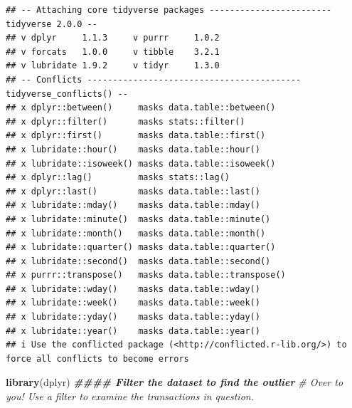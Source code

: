 \documentclass[
]{article}
\newenvironment{Shaded}{\begin{snugshade}}{\end{snugshade}}
\newcommand{\CommentTok}[1]{\textcolor[rgb]{0.56,0.35,0.01}{\textit{#1}}}
\newcommand{\DecValTok}[1]{\textcolor[rgb]{0.00,0.00,0.81}{#1}}
\newcommand{\DocumentationTok}[1]{\textcolor[rgb]{0.56,0.35,0.01}{\textbf{\textit{#1}}}}
\newcommand{\FunctionTok}[1]{\textcolor[rgb]{0.13,0.29,0.53}{\textbf{#1}}}
\newcommand{\NormalTok}[1]{#1}
\newcommand{\OtherTok}[1]{\textcolor[rgb]{0.56,0.35,0.01}{#1}}
\newcommand{\SpecialCharTok}[1]{\textcolor[rgb]{0.81,0.36,0.00}{\textbf{#1}}}
\begin{document}
\begin{verbatim}
## -- Attaching core tidyverse packages ------------------------ tidyverse 2.0.0 --
## v dplyr     1.1.3     v purrr     1.0.2
## v forcats   1.0.0     v tibble    3.2.1
## v lubridate 1.9.2     v tidyr     1.3.0
## -- Conflicts ------------------------------------------ tidyverse_conflicts() --
## x dplyr::between()     masks data.table::between()
## x dplyr::filter()      masks stats::filter()
## x dplyr::first()       masks data.table::first()
## x lubridate::hour()    masks data.table::hour()
## x lubridate::isoweek() masks data.table::isoweek()
## x dplyr::lag()         masks stats::lag()
## x dplyr::last()        masks data.table::last()
## x lubridate::mday()    masks data.table::mday()
## x lubridate::minute()  masks data.table::minute()
## x lubridate::month()   masks data.table::month()
## x lubridate::quarter() masks data.table::quarter()
## x lubridate::second()  masks data.table::second()
## x purrr::transpose()   masks data.table::transpose()
## x lubridate::wday()    masks data.table::wday()
## x lubridate::week()    masks data.table::week()
## x lubridate::yday()    masks data.table::yday()
## x lubridate::year()    masks data.table::year()
## i Use the conflicted package (<http://conflicted.r-lib.org/>) to force all conflicts to become errors
\end{verbatim}

\begin{Shaded}
\begin{Highlighting}[]
\FunctionTok{library}\NormalTok{(dplyr)}
\DocumentationTok{\#\#\#\# Filter the dataset to find the outlier}
\CommentTok{\# Over to you! Use a filter to examine the transactions in question.}
\end{Highlighting}
\end{Shaded}

\begin{Shaded}
\end{Shaded}
\end{document}
